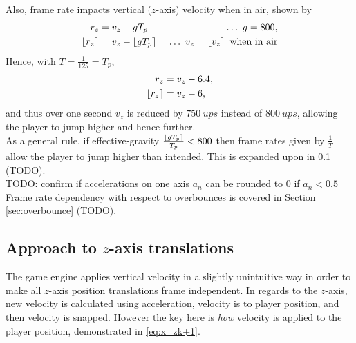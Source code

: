 Also, frame rate impacts vertical ($z$-axis) velocity when in air, shown by
\begin{align*}
r_z &= v_z - gT_p\ &\ldots\ g = 800,\\
\round{r_z} &= v_z - \round{gT_p}\ &\ldots\ v_z = \round{v_z}\ \text{when in air}
\end{align*}
Hence, with $T = \frac{1}{125} = T_p$,
\begin{align*}
r_z &= v_z - 6.4,\\
\left\lfloor r_z\right\rceil &= v_z - 6,
\end{align*}
and thus over one second $v_z$ is reduced by $\qty{750}{ups}$ instead of $\qty{800}{ups}$, allowing the player to jump higher and hence further.\\
As a general rule, if effective-gravity $\frac{\left\lfloor gT_p\right\rceil}{T_p} < 800$ then frame rates given by $\frac{1}{T}$ allow the player to jump higher than intended.
This is expanded upon in \ref{sec:x_z} (TODO).\\

%
TODO: confirm if accelerations on one axis $a_n$ can be rounded to 0 if $a_n < 0.5$\\
%

Frame rate dependency with respect to overbounces is covered in Section \ref{sec:overbounce} (TODO).


\subsection{Approach to $z$-axis translations}
\label{sec:x_z}
The game engine applies vertical velocity in a slightly unintuitive way in order to make all $z$-axis position translations frame independent.
In regards to the $z$-axis, new velocity is calculated using acceleration, velocity is to player position, and then velocity is snapped.
However the key here is \emph{how} velocity is applied to the player position, demonstrated in \eqref{eq:x_zk+1}.

